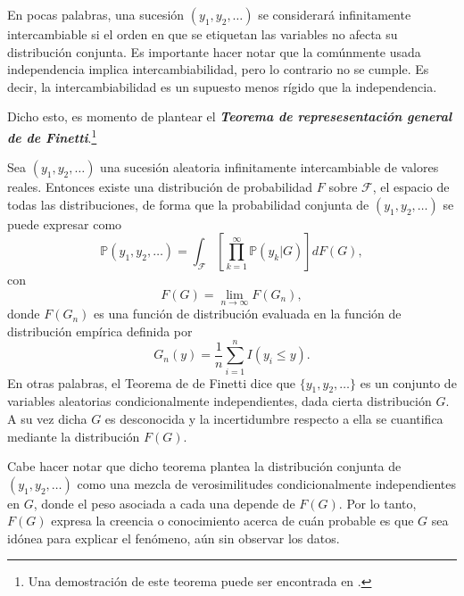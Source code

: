 En pocas palabras, una sucesi\'on $(y_1,y_2,\ldots)$ se considerar\'a infinitamente intercambiable si el orden en que se etiquetan las variables no afecta su distribuci\'on conjunta. Es importante hacer notar que la com\'unmente usada independencia implica intercambiabilidad, pero lo contrario no se cumple. Es decir, la intercambiabilidad es un supuesto menos r\'igido que la independencia.

Dicho esto, es momento de plantear el \textbf{\textit{Teorema de represesentaci\'on general de de Finetti}}.\footnote{Una demostraci\'on de este teorema puede ser encontrada en \cite{Schervish_TheoryStats}.}

\begin{theorem*}
    Sea $(y_1,y_2,\ldots)$ una sucesi\'on aleatoria infinitamente intercambiable de valores reales. Entonces existe una distribuci\'on de probabilidad $F$ sobre $\mathcal{F}$, el espacio de todas las distribuciones, de forma que la probabilidad conjunta de $(y_1,y_2,\ldots)$ se puede expresar como
    \begin{equation*}
        \mathbb{P}(y_1,y_2,\ldots) =
        \int_{\mathcal{F}}\left[\prod_{k=1}^\infty \mathbb{P}(y_k|G)\right]dF(G),
    \end{equation*}
    con
    \begin{equation*}
        F(G) = \lim_{n \to \infty} F(G_n),
    \end{equation*}
    donde $F(G_n)$ es una funci\'on de distribuci\'on evaluada en la funci\'on de distribuci\'on emp\'irica definida por
    \begin{equation*}
        G_n(y) = \frac{1}{n} \sum_{i=1}^n I(y_i \leq y).
    \end{equation*}
    En otras palabras, el Teorema de de Finetti dice que $\{y_1,y_2,\ldots\}$ es un conjunto de variables aleatorias condicionalmente independientes, dada cierta distribuci\'on $G$. A su vez dicha $G$ es desconocida y la incertidumbre respecto a ella se cuantifica mediante la distribuci\'on $F(G)$.
\end{theorem*}

Cabe hacer notar que dicho teorema plantea la distribuci\'on conjunta de $(y_1,y_2,\ldots)$ como una mezcla de verosimilitudes condicionalmente independientes en $G$, donde el peso asociada a cada una depende de $F(G)$. Por lo tanto, $F(G)$ expresa la creencia o conocimiento acerca de cu\'an probable es que $G$ sea id\'onea para explicar el fen\'omeno, a\'un sin observar los datos.

